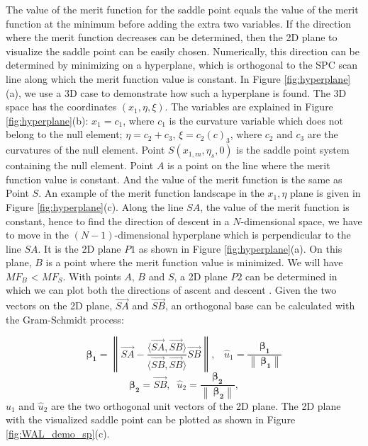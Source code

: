 The value of the merit function for the saddle point equals the value of the merit function at the minimum before adding the extra two variables. If the direction where the merit function decreases can be determined, then the 2D plane to visualize the saddle point can be easily chosen. Numerically, this direction can be determined by minimizing on a hyperplane, which is orthogonal to the SPC scan line along which the merit function value is constant. In Figure \ref{fig:hyperplane}(a), we use a 3D case to demonstrate how such a hyperplane is found. The 3D space has the coordinates $(x_1, \eta, \xi)$. The variables are explained in Figure \ref{fig:hyperplane}(b): $x_1 = c_1$, where $c_1$ is the curvature variable which does not belong to the null element; $\eta = c_2 + c_3$, $\xi = c_2(c)_3$, where $c_2$ and $c_3$ are the curvatures of the null element.  Point $S (x_{1,m}, \eta_{s}, 0)$ is the saddle point system containing the null element. Point $A$ is a point on the line where the merit function value is constant. And the value of the merit function is the same as Point $S$. An example of the merit function landscape in the $x_1, \eta$ plane is given in Figure \ref{fig:hyperplane}(c). Along the line $SA$, the value of the merit function is constant, hence to find the direction of descent in a $N$-dimensional space, we have to move in the $(N-1)$-dimensional hyperplane which is perpendicular to the line $SA$. It is the 2D plane $P1$ as shown in Figure \ref{fig:hyperplane}(a). On this plane, $B$ is a point where the merit function value is minimized. We will have $MF_{B}$ < $MF_{S}$. With points $A$, $B$ and $S$, a 2D plane $P2$ can be determined in which we can plot both the directions of ascent and descent . Given the two vectors on the 2D plane, $\overrightarrow{SA}$ and $\overrightarrow{SB}$, an orthogonal base can be calculated with the Gram-Schmidt process:

\setlength{\belowdisplayshortskip}{5pt}
\setlength{\abovedisplayshortskip}{5pt}
\begin{equation} \label{eq:u1}
\pmb{\beta_{1}} =  \left\| \overrightarrow{SA}-{\frac{\langle \overrightarrow{SA},\overrightarrow{SB}\rangle}{\langle \overrightarrow{SB},\overrightarrow{SB}\rangle}}\overrightarrow{SB} \right\|,  \; \; \; \hat{u}_{1} = \frac{\pmb{\beta_{1}}}{\left\|\ \pmb{\beta_{1}}\right\|}
\end{equation}
\setlength{\belowdisplayshortskip}{10pt}
\begin{equation} \label{eq:u2}
\pmb{\beta_{2}} = \overrightarrow{SB}, \;\; 
\hat{u}_{2} =\frac{\pmb{\beta_{2}}}{\left\|\ \pmb{\beta_{2}}\right\|} ,
\end{equation}
 $\hat{u}_{1}$ and $\hat{u}_{2}$  are the two orthogonal unit vectors of the 2D plane. The 2D plane with the visualized saddle point can be plotted as shown in Figure \ref{fig:WAL_demo_sp}(c).

